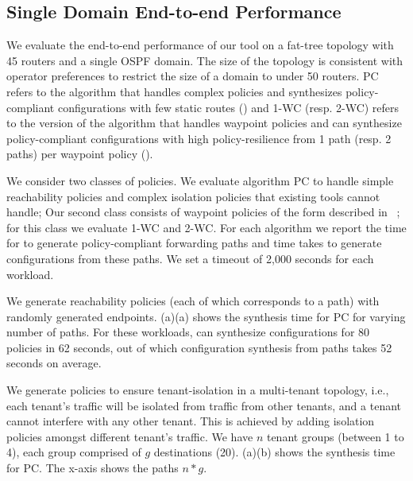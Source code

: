 \subsection{Single Domain End-to-end Performance}\label{sec:ospfeval}


We evaluate the end-to-end performance of our tool
on a  fat-tree 
topology with 45 routers
and a single OSPF domain. 
The size of the topology is consistent with operator preferences to restrict
the size of a domain to under 50 routers.
PC refers to the algorithm that handles complex policies and
synthesizes policy-compliant
configurations with few static routes ()
and 
1-WC (resp. 2-WC) refers to the version of the algorithm that handles waypoint policies and
can synthesize policy-compliant
configurations with high policy-resilience from 1 path (resp. 2 paths) per waypoint policy ().

We consider two classes of policies. 
We evaluate algorithm PC to handle simple
reachability policies and complex isolation policies that 
existing tools cannot handle; 
Our second class consists of
 waypoint policies of the form described in ~;
for this class we evaluate 1-WC and 2-WC.
For each algorithm we report the time for 
\genesis to generate policy-compliant forwarding paths
and time \name takes to generate configurations 
from these paths. We set a timeout of 2,000 seconds for each workload.

We generate reachability policies (each of which 
corresponds to a path) with randomly generated endpoints.
(a)(a) shows the synthesis time for
PC for varying number of paths. 
For these workloads, \name can
synthesize configurations for 80 policies in 62 
seconds, out of which configuration synthesis from paths 
takes 52 seconds on average.

We generate policies to ensure tenant-isolation
in a multi-tenant topology, i.e., each
tenant's traffic will be isolated from traffic from
other tenants, and a tenant cannot interfere with any 
other tenant. This is achieved by adding isolation policies
amongst different tenant's traffic. 
We have $n$ tenant groups (between 1 to 4), 
each group comprised of $g$ destinations (20). 
(a)(b)
shows the synthesis time 
for PC.
The x-axis shows the paths $n * g$. 
 
 

